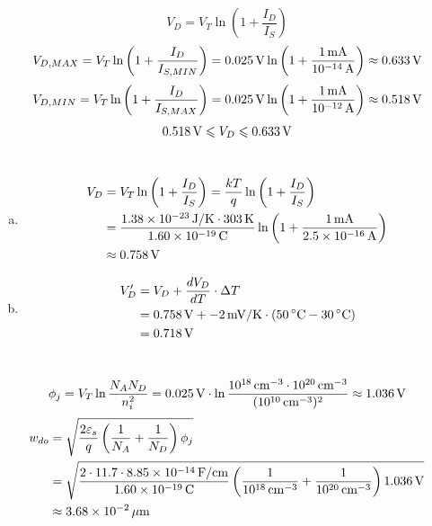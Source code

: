 \documentclass{article}
\newcommand{\unit}[1]{{\rm\,#1}}
\begin{document}
\section{}
$$V_D=V_T\ln\left(1+\frac{I_D}{I_S}\right)$$
$$V_{D,MAX}=V_T\ln\left(1+\frac{I_D}{I_{S,MIN}}\right)=0.025\unit{V}\ln\left(1+\frac{1\unit{mA}}{10^{-14}\unit{A}}\right)\approx0.633\unit{V}$$
$$V_{D,MIN}=V_T\ln\left(1+\frac{I_D}{I_{S,MAX}}\right)=0.025\unit{V}\ln\left(1+\frac{1\unit{mA}}{10^{-12}\unit{A}}\right)\approx0.518\unit{V}$$
$$0.518\unit{V}\leqslant V_D\leqslant0.633\unit{V}$$

\section{}
\begin{enumerate}[(a)]
\item
\begin{align*}
V_D&=V_T\ln\left(1+\frac{I_D}{I_S}\right)=\frac{kT}{q}\ln\left(1+\frac{I_D}{I_S}\right)\\
&=\frac{1.38\times10^{-23}\unit{J/K}\cdot303\unit{K}}{1.60\times10^{-19}\unit{C}}\ln\left(1+\frac{1\unit{mA}}{2.5\times10^{-16}\unit{A}}\right)\\
&\approx0.758\unit{V}
\end{align*}
\item
\begin{align*}
V_D'&=V_D+\frac{dV_D}{dT}\cdot\Delta T\\
&=0.758\unit{V}+-2\unit{mV/K}\cdot(50\unit{^\circ C}-30\unit{^\circ C})\\
&=0.718\unit{V}
\end{align*}

\end{enumerate}

\section{}
$$\phi_j=V_T\ln\frac{N_AN_D}{n_i^2}=0.025\unit{V}\cdot\ln\frac{10^{18}\unit{cm^{-3}}\cdot10^{20}\unit{cm^{-3}}}{(10^{10}\unit{cm^{-3}})^2}\approx1.036\unit{V}$$
\begin{align*}
w_{do}&=\sqrt{\frac{2\varepsilon_s}{q}\left(\frac{1}{N_A}+\frac{1}{N_D}\right)\phi_j}\\
&=\sqrt{\frac{2\cdot11.7\cdot8.85\times10^{-14}\unit{F/cm}}{1.60\times10^{-19}\unit{C}}\left(\frac{1}{10^{18}\unit{cm^{-3}}}+\frac{1}{10^{20}\unit{cm^{-3}}}\right)1.036\unit{V}}\\
&\approx3.68\times10^{-2}\unit{\mu m}
\end{align*}
\end{document}
